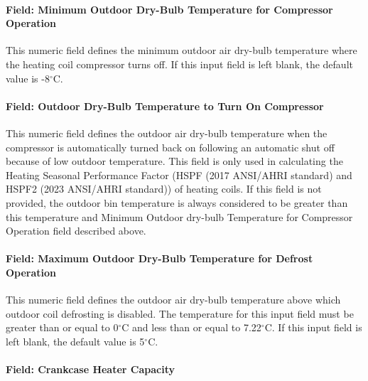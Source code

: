 \paragraph{Field: Minimum Outdoor Dry-Bulb Temperature for Compressor Operation}\label{field-minimum-outdoor-dry-bulb-temperature-for-compressor-operation}

This numeric field defines the minimum outdoor air dry-bulb temperature where the heating coil compressor turns off. If this input field is left blank, the default value is -8$^\circ$C.

\paragraph{Field: Outdoor Dry-Bulb Temperature to Turn On Compressor}\label{field-outdoor-dry-bulb-temperature-to-turn-on-compressor}

This numeric field defines the outdoor air dry-bulb temperature when the compressor is automatically turned back on following an automatic shut off because of low outdoor temperature. This field is only used in calculating the Heating Seasonal Performance Factor (HSPF (2017 ANSI/AHRI standard) and HSPF2 (2023 ANSI/AHRI standard)) of heating coils. If this field is not provided, the outdoor bin temperature is always considered to be greater than this temperature and Minimum Outdoor dry-bulb Temperature for Compressor Operation field described above.

\paragraph{Field: Maximum Outdoor Dry-Bulb Temperature for Defrost Operation}\label{field-maximum-outdoor-dry-bulb-temperature-for-defrost-operation}

This numeric field defines the outdoor air dry-bulb temperature above which outdoor coil defrosting is disabled. The temperature for this input field must be greater than or equal to 0$^\circ$C and less than or equal to 7.22$^\circ$C. If this input field is left blank, the default value is 5$^\circ$C.

\paragraph{Field: Crankcase Heater Capacity}\label{field-crankcase-heater-capacity-4}

